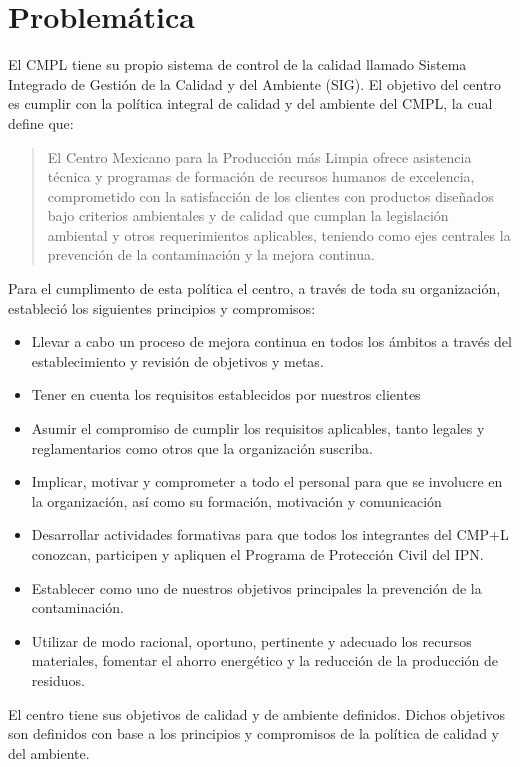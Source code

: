 \section{Problemática}
El CMPL tiene su propio sistema de control de la calidad llamado Sistema Integrado de Gestión de la Calidad y del Ambiente (SIG). El objetivo del centro es cumplir con la política integral de calidad y del ambiente del CMPL, la cual define que:

\begin{quote}
El Centro Mexicano para la Producción más Limpia ofrece asistencia técnica y programas de formación de recursos humanos de excelencia, comprometido con la satisfacción de los clientes con productos diseñados bajo criterios ambientales y de calidad  que cumplan la legislación ambiental y otros requerimientos  aplicables, teniendo como ejes centrales la prevención de la contaminación y la mejora continua.
\end{quote}

Para el cumplimento de esta política el centro, a través de toda su organización,  estableció los siguientes principios y compromisos:

\begin{itemize}
	\item	Llevar a cabo un proceso de mejora continua en todos los ámbitos a través del establecimiento y revisión de objetivos y metas.
	\item 	Tener en cuenta los requisitos establecidos por nuestros clientes
	\item 	Asumir el compromiso de cumplir los requisitos aplicables, tanto legales y reglamentarios como otros que la organización suscriba.
	\item 	Implicar, motivar y comprometer a todo el personal para que se involucre en la organización, así como su formación, motivación y comunicación
	\item 	Desarrollar actividades formativas para que todos los integrantes del CMP+L conozcan, participen y apliquen el Programa de Protección Civil del IPN.
	\item 	Establecer como uno de nuestros objetivos principales la prevención de la contaminación. 	\item Utilizar de modo racional, oportuno, pertinente y adecuado los recursos materiales, fomentar el ahorro energético y la reducción de la producción de residuos. 
\end{itemize}

El centro tiene sus objetivos de calidad y de ambiente definidos. Dichos objetivos son definidos con base a los principios y compromisos de la política de calidad y del ambiente.

